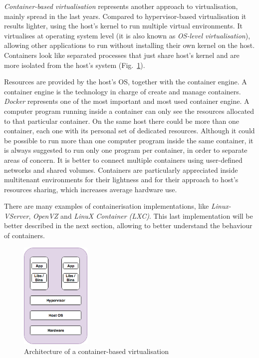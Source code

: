 \documentclass[a4paper,12pt]{article}
\def\myfig#1{Fig.~#1\xspace}
\begin{document}
\textit{Container-based virtualisation} represents another approach to
virtualisation, mainly spread in the last years. Compared to hypervisor-based
virtualisation it results lighter, using the host's kernel to run multiple
virtual environments. It virtualises at operating system level (it is also known
as \textit{OS-level virtualisation}), allowing other applications to run without
installing their own kernel on the host. Containers look like separated processes
that just share host's kernel and are more isolated from the host's
system (\myfig{\ref{fig:container_architecture}}). \par Resources are provided by
the host's OS, together with the container engine. A container engine is the
technology in charge of create and manage containers. \textit{Docker} represents
one of the most important and most used container engine. A computer program
running inside a container can only see the resources allocated to that particular
container. On the same host there could be more than one container, each one
with its personal set of dedicated resources. Although it could be possible to
run more than one computer program inside the same container, it is always
suggested to run only one program per container, in order to separate areas of
concern. It is better to connect multiple containers using user-defined networks
and shared volumes. Containers are particularly appreciated inside multitenant
environments for their lightness and for their approach to host's resources
sharing, which increases average hardware use.\par There are many examples of
containerisation implementations, like \textit{Linux-VServer}, \textit{OpenVZ}
and \textit{LinuX Container (LXC)}. This last implementation will be better
described in the next section, allowing to better understand the behaviour of
containers. 

\begin{figure}[ht!]
  \centerline{\includegraphics[width=0.3\textwidth]{container_architecture.png}}
  \caption{Architecture of a container-based virtualisation}
  \label{fig:container_architecture}
  \end{figure}
\end{document}
